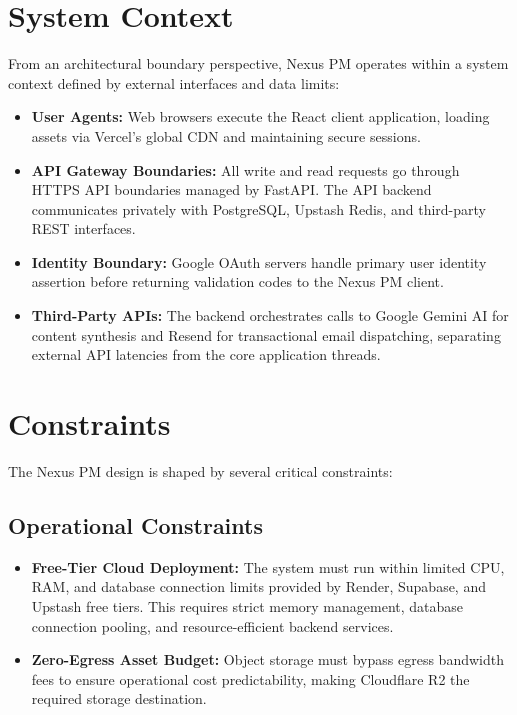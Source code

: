 \section{System Context}
From an architectural boundary perspective, Nexus PM operates within a system context defined by external interfaces and data limits:
\begin{itemize}
    \item \textbf{User Agents:} Web browsers execute the React client application, loading assets via Vercel's global CDN and maintaining secure sessions.
    \item \textbf{API Gateway Boundaries:} All write and read requests go through HTTPS API boundaries managed by FastAPI. The API backend communicates privately with PostgreSQL, Upstash Redis, and third-party REST interfaces.
    \item \textbf{Identity Boundary:} Google OAuth servers handle primary user identity assertion before returning validation codes to the Nexus PM client.
    \item \textbf{Third-Party APIs:} The backend orchestrates calls to Google Gemini AI for content synthesis and Resend for transactional email dispatching, separating external API latencies from the core application threads.
\end{itemize}

\section{Constraints}
The Nexus PM design is shaped by several critical constraints:
\subsection{Operational Constraints}
\begin{itemize}
    \item \textbf{Free-Tier Cloud Deployment:} The system must run within limited CPU, RAM, and database connection limits provided by Render, Supabase, and Upstash free tiers. This requires strict memory management, database connection pooling, and resource-efficient backend services.
    \item \textbf{Zero-Egress Asset Budget:} Object storage must bypass egress bandwidth fees to ensure operational cost predictability, making Cloudflare R2 the required storage destination.
\end{itemize}

